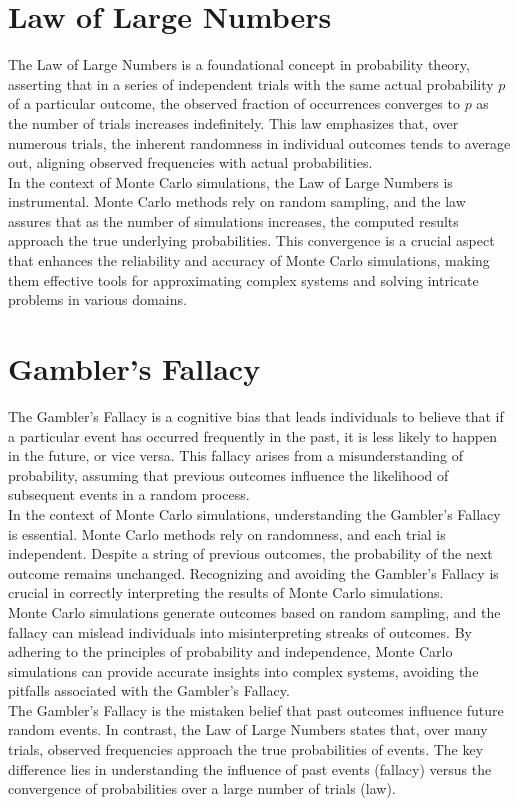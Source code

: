 \documentclass[12pt]{article}
\begin{document}
    \section{Law of Large Numbers}
    The Law of Large Numbers is a foundational concept in probability theory, asserting that in a series of independent trials with the same actual probability $p$ of a particular outcome, the observed fraction of occurrences converges to $p$ as the number of trials increases indefinitely. This law emphasizes that, over numerous trials, the inherent randomness in individual outcomes tends to average out, aligning observed frequencies with actual probabilities.\\
    In the context of Monte Carlo simulations, the Law of Large Numbers is instrumental. Monte Carlo methods rely on random sampling, and the law assures that as the number of simulations increases, the computed results approach the true underlying probabilities. This convergence is a crucial aspect that enhances the reliability and accuracy of Monte Carlo simulations, making them effective tools for approximating complex systems and solving intricate problems in various domains.

    \section{Gambler's Fallacy}
    The Gambler's Fallacy is a cognitive bias that leads individuals to believe that if a particular event has occurred frequently in the past, it is less likely to happen in the future, or vice versa. This fallacy arises from a misunderstanding of probability, assuming that previous outcomes influence the likelihood of subsequent events in a random process.\\
    In the context of Monte Carlo simulations, understanding the Gambler's Fallacy is essential. Monte Carlo methods rely on randomness, and each trial is independent. Despite a string of previous outcomes, the probability of the next outcome remains unchanged. Recognizing and avoiding the Gambler's Fallacy is crucial in correctly interpreting the results of Monte Carlo simulations.\\
    Monte Carlo simulations generate outcomes based on random sampling, and the fallacy can mislead individuals into misinterpreting streaks of outcomes. By adhering to the principles of probability and independence, Monte Carlo simulations can provide accurate insights into complex systems, avoiding the pitfalls associated with the Gambler's Fallacy.\\
    The Gambler's Fallacy is the mistaken belief that past outcomes influence future random events. In contrast, the Law of Large Numbers states that, over many trials, observed frequencies approach the true probabilities of events. The key difference lies in understanding the influence of past events (fallacy) versus the convergence of probabilities over a large number of trials (law).
\end{document}

